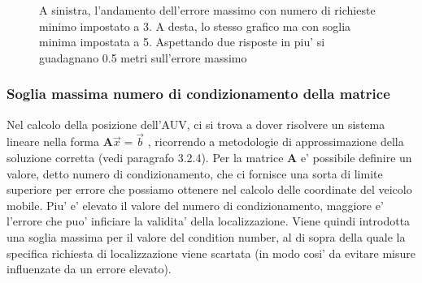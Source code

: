 \begin{figure}[H]
    \centering
    \hfill
    \caption{A sinistra, l'andamento dell'errore massimo con numero di richieste minimo impostato a 3. A desta, lo stesso grafico ma con soglia minima impostata a 5. Aspettando due risposte in piu' si guadagnano 0.5 metri sull'errore massimo}
\end{figure}
\subsubsection{Soglia massima numero di condizionamento della matrice}
\par
Nel calcolo della posizione dell'AUV, ci si trova a dover risolvere un sistema lineare nella forma  \(\textbf{A}\overrightarrow{x} = \overrightarrow{b} \) , ricorrendo a metodologie di approssimazione della soluzione corretta (vedi paragrafo 3.2.4). Per la matrice \(\textbf{A}\) e' possibile definire un valore, detto numero di condizionamento, che ci fornisce una sorta di limite superiore  per errore che possiamo ottenere nel calcolo delle coordinate del veicolo mobile. Piu' e' elevato il valore del numero di condizionamento, maggiore e' l'errore che puo' inficiare la validita' della localizzazione. Viene quindi introdotta una soglia massima per il valore del condition number, al di sopra della quale la specifica richiesta di localizzazione viene scartata (in modo cosi' da evitare misure influenzate da un errore elevato).
